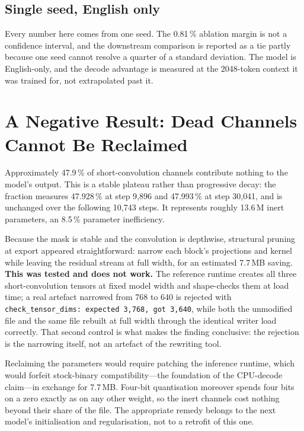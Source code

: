 \documentclass[conference]{IEEEtran}
\begin{document}
\subsection{Single seed, English only}

Every number here comes from one seed. The 0.81\,\% ablation margin is not a
confidence interval, and the downstream comparison is reported as a tie partly
because one seed cannot resolve a quarter of a standard deviation. The model is
English-only, and the decode advantage is measured at the 2048-token context it
was trained for, not extrapolated past it.

\section{A Negative Result: Dead Channels Cannot Be Reclaimed}
\label{sec:dead}

Approximately 47.9\,\% of short-convolution channels contribute nothing to the
model's output. This is a stable plateau rather than progressive decay: the
fraction measures 47.928\,\% at step 9{,}896 and 47.993\,\% at step 30{,}041,
and is unchanged over the following 10{,}743 steps. It represents roughly
13.6\,M inert parameters, an 8.5\,\% parameter inefficiency.

Because the mask is stable and the convolution is depthwise, structural pruning
at export appeared straightforward: narrow each block's projections and kernel
while leaving the residual stream at full width, for an estimated 7.7\,MB
saving. \textbf{This was tested and does not work.} The reference runtime creates
all three short-convolution tensors at fixed model width and shape-checks them at
load time; a real artefact narrowed from 768 to 640 is rejected with
\texttt{check\_tensor\_dims: expected 3,768, got 3,640}, while both the
unmodified file and the same file rebuilt at full width through the identical
writer load correctly. That second control is what makes the finding conclusive:
the rejection is the narrowing itself, not an artefact of the rewriting tool.

Reclaiming the parameters would require patching the inference runtime, which
would forfeit stock-binary compatibility---the foundation of the CPU-decode
claim---in exchange for 7.7\,MB. Four-bit quantisation moreover spends four bits
on a zero exactly as on any other weight, so the inert channels cost nothing
beyond their share of the file. The appropriate remedy belongs to the next
model's initialisation and regularisation, not to a retrofit of this one.
\end{document}
